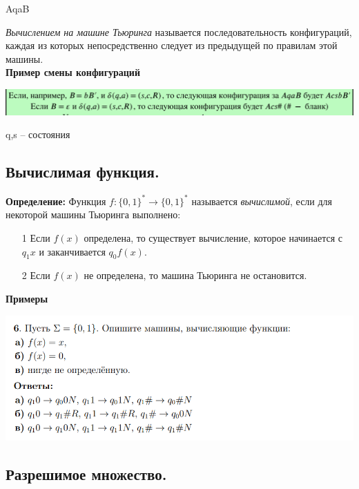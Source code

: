AqaB

\textit{Вычислением на машине Тьюринга} называется последовательность конфигураций, каждая из которых непосредственно следует из предыдущей по правилам этой машины.\\

\textbf{Пример смены конфигураций}

\begin{center}
    \includegraphics[width =17cm]{images/3 (определения)_mmm1.PNG}
\end{center}

q,s -- состояния

\subsection{Вычислимая функция.}

\textbf{Определение: } Функция $f: \{0,1\}^* \rightarrow \{0,1\}^*$ называется \textit{вычислимой}, если для некоторой машины Тьюринга выполнено:
\begin{itemize}
    \item[1] Если $f(x)$ определена, то существует вычисление, которое начинается с $q_{1}x$ и заканчивается $q_0f(x)$.
    \item[2] Если $f(x)$ не определена, то машина Тьюринга не остановится.
\end{itemize}

\textbf{Примеры}

\begin{center}
    \includegraphics[width=15cm]{images/mt_1_def.png}
\end{center}

\subsection{Разрешимое множество.}

